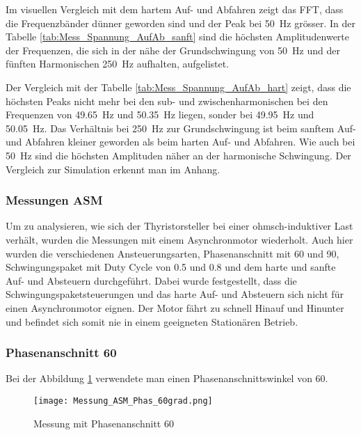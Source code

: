 Im visuellen Vergleich mit dem hartem Auf- und Abfahren zeigt das FFT, dass die Frequenzbänder dünner geworden sind und der Peak bei \SI{50}{Hz} grösser. In der Tabelle \ref{tab:Mess_Spannung_AufAb_sanft} sind die höchsten Amplitudenwerte der Frequenzen, die sich in der nähe der Grundschwingung von \SI{50}{Hz} und der fünften Harmonischen \SI{250}{Hz} aufhalten, aufgelistet. 

Der Vergleich mit der Tabelle \ref{tab:Mess_Spannung_AufAb_hart} zeigt, dass die höchsten Peaks nicht mehr bei den sub- und zwischenharmonischen bei den Frequenzen von \SI{49.65}{Hz} und \SI{50.35}{Hz} liegen, sonder bei \SI{49.95}{Hz} und \SI{50.05}{Hz}. Das Verhältnis bei \SI{250}{Hz} zur Grundschwingung ist beim sanftem Auf- und Abfahren kleiner geworden als beim harten Auf- und Abfahren. Wie auch bei \SI{50}{Hz} sind die höchsten Amplituden näher an der harmonische Schwingung. Der Vergleich zur Simulation erkennt man im Anhang.

\newpage
\subsubsection{Messungen ASM}

Um zu analysieren, wie sich der Thyristorsteller bei einer ohmsch-induktiver Last verhält, wurden die Messungen mit einem Asynchronmotor wiederholt. Auch hier wurden die verschiedenen Ansteuerungsarten, Phasenanschnitt mit 60\textdegree \hspace{0.02cm} und 90\textdegree \hspace{0.02cm}, Schwingungspaket mit Duty Cycle von 0.5 und 0.8 und dem harte und sanfte Auf- und Absteuern durchgeführt. Dabei wurde festgestellt, dass die Schwingungspaketsteuerungen und das harte Auf- und Absteuern sich nicht für einen Asynchronmotor eignen. Der Motor fährt zu schnell Hinauf und Hinunter und befindet sich somit nie in einem geeigneten Stationären Betrieb. 

\subsubsection*{Phasenanschnitt 60\textdegree}

Bei der Abbildung \ref{fig:Mess_ASM_Phas60} verwendete man einen Phasenanschnittswinkel von 60\textdegree.

\begin{figure}[ht!]
	\centering
	\texttt{[image: Messung\_ASM\_Phas\_60grad.png]}	
	\caption{Messung mit Phasenanschnitt 60\textdegree}\label{fig:Mess_ASM_Phas60}
\end{figure}
 

